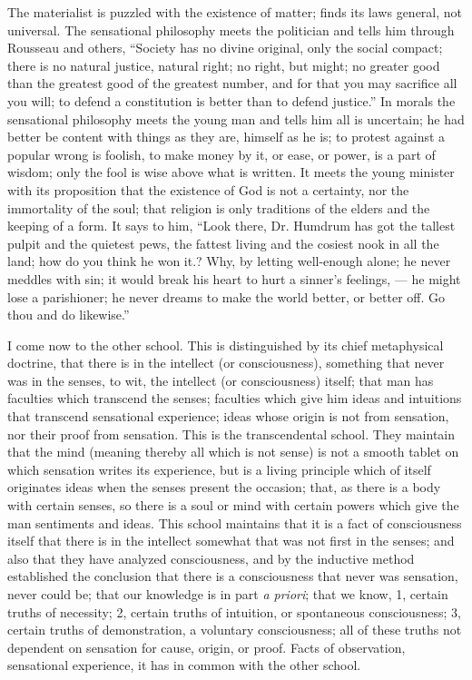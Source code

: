 \documentclass[12pt]{article}
\begin{document}
The materialist is puzzled with the existence of matter; finds its laws general, not universal. The sensational philosophy meets the politician and tells him through Rousseau and others, ``Society has no divine original, only the social compact; there is no natural 
justice, natural right; no right, but might; no greater 
good than the greatest good of the greatest number, 
and for that you may sacrifice all you will; to defend 
a constitution is better than to defend justice.'' In 
morals the sensational philosophy meets the young man 
and tells him all is uncertain; he had better be content 
with things as they are, himself as he is; to protest 
against a popular wrong is foolish, to make money by 
it, or ease, or power, is a part of wisdom; only the 
fool is wise above what is written. It meets the young 
minister with its proposition that the existence of God is 
not a certainty, nor the immortality of the soul; that 
religion is only traditions of the elders and the keeping 
of a form. It says to him, ``Look there, Dr. Humdrum has got the tallest pulpit and the quietest pews, 
the fattest living and the cosiest nook in all the land; 
how do you think he won it.? Why, by letting well-enough alone; he never meddles with sin; it would break 
his heart to hurt a sinner's feelings, --- he might lose a 
parishioner; he never dreams to make the world better, 
or better off. Go thou and do likewise.'' 

I come now to the other school. This is distinguished by its chief metaphysical doctrine, that there is 
in the intellect (or consciousness), something that never 
was in the senses, to wit, the intellect (or consciousness) itself; that man has faculties which transcend the 
senses; faculties which give him ideas and intuitions 
that transcend sensational experience; ideas whose 
origin is not from sensation, nor their proof from sensation. This is the transcendental school. They 
maintain that the mind (meaning thereby all which is 
not sense) is not a smooth tablet on which sensation 
writes its experience, but is a living principle which of 
itself originates ideas when the senses present the occasion; that, as there is a body with certain senses, so 
there is a soul or mind with certain powers which give 
the man sentiments and ideas. This school maintains 
that it is a fact of consciousness itself that there is in 
the intellect somewhat that was not first in the senses; 
and also that they have analyzed consciousness, and by 
the inductive method established the conclusion that 
there is a consciousness that never was sensation, never 
could be; that our knowledge is in part \emph{a priori}; that 
we know, 1, certain truths of necessity; 2, certain 
truths of intuition, or spontaneous consciousness; 3, 
certain truths of demonstration, a voluntary consciousness; all of these truths not dependent on sensation for 
cause, origin, or proof. Facts of observation, sensational experience, it has in common with the other 
school. 
\end{document}
